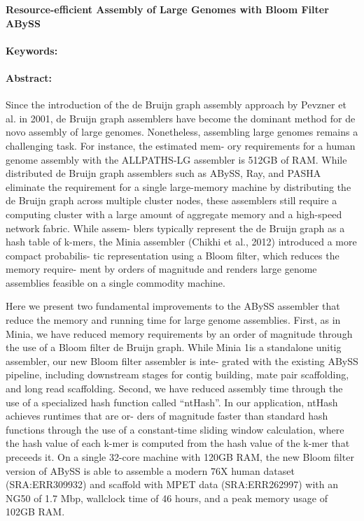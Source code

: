 \noindent
\large {\bf Resource-efficient Assembly of Large Genomes with Bloom Filter ABySS} 


\normalsize 


\noindent \paragraph{Keywords:} 

\noindent \paragraph{Abstract:} 
Since the introduction of the de Bruijn graph assembly approach by Pevzner
et al. in 2001, de Bruijn graph assemblers have become the dominant
method for de novo assembly of large genomes. Nonetheless, assembling
large genomes remains a challenging task. For instance, the estimated mem-
ory requirements for a human genome assembly with the ALLPATHS-LG
assembler is 512GB of RAM. While distributed de Bruijn graph assemblers
such as ABySS, Ray, and PASHA eliminate the requirement for a single
large-memory machine by distributing the de Bruijn graph across multiple
cluster nodes, these assemblers still require a computing cluster with a large
amount of aggregate memory and a high-speed network fabric. While assem-
blers typically represent the de Bruijn graph as a hash table of k-mers, the
Minia assembler (Chikhi et al., 2012) introduced a more compact probabilis-
tic representation using a Bloom filter, which reduces the memory require-
ment by orders of magnitude and renders large genome assemblies feasible
on a single commodity machine.

Here we present two fundamental improvements to the ABySS assembler
that reduce the memory and running time for large genome assemblies.
First, as in Minia, we have reduced memory requirements by an order of
magnitude through the use of a Bloom filter de Bruijn graph. While Minia
1is a standalone unitig assembler, our new Bloom filter assembler is inte-
grated with the existing ABySS pipeline, including downstream stages for
contig building, mate pair scaffolding, and long read scaffolding. Second, we
have reduced assembly time through the use of a specialized hash function
called ``ntHash''. In our application, ntHash achieves runtimes that are or-
ders of magnitude faster than standard hash functions through the use of
a constant-time sliding window calculation, where the hash value of each
k-mer is computed from the hash value of the k-mer that preceeds it. On
a single 32-core machine with 120GB RAM, the new Bloom filter version of
ABySS is able to assemble a modern 76X human dataset (SRA:ERR309932)
and scaffold with MPET data (SRA:ERR262997) with an NG50 of 1.7 Mbp,
wallclock time of 46 hours, and a peak memory usage of 102GB RAM.

